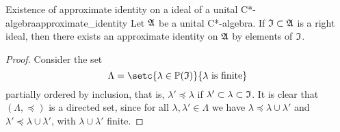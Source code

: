 \begin{theorem}{Existence of approximate identity on a ideal of a unital C*-algebra}{approximate_identity}
    Let \(\mathfrak{A}\) be a unital C*-algebra. If \(\mathfrak{I} \subset \mathfrak{A}\) is a right ideal, then there exists an approximate identity on \(\mathfrak{A}\) by elements of \(\mathfrak{I}\).
\end{theorem}
\begin{proof}
    Consider the set
    \begin{equation*}
        \Lambda = \setc{\lambda \in \mathbb{P}(\algebra{I})}{\lambda\text{ is finite}}
    \end{equation*}
    partially ordered by inclusion, that is, \(\lambda' \preceq \lambda\) if \(\lambda' \subset \lambda \subset \mathfrak{I}\). It is clear that \((\Lambda, \preceq)\) is a directed set, since for all \(\lambda, \lambda' \in \Lambda\) we have \(\lambda \preceq \lambda \cup \lambda'\) and \(\lambda' \preceq \lambda \cup \lambda'\), with \(\lambda \cup \lambda'\) finite.


\end{proof}
